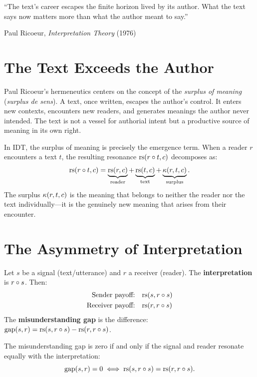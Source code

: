 \epigraph{``The text's career escapes the finite horizon lived by its author.
What the text says now matters more than what the author meant to say.''}{Paul Ricoeur, \textit{Interpretation Theory} (1976)}

\section{The Text Exceeds the Author}

Paul Ricoeur's hermeneutics centers on the concept of the \emph{surplus of
meaning} (\textit{surplus de sens}). A text, once written, escapes the author's
control. It enters new contexts, encounters new readers, and generates meanings
the author never intended. The text is not a vessel for authorial intent but a
productive source of meaning in its own right.

In IDT, the surplus of meaning is precisely the emergence term. When a reader
$r$ encounters a text $t$, the resulting resonance $\mathrm{rs}(r \circ t, c)$
decomposes as:
\[
\mathrm{rs}(r \circ t, c) = \underbrace{\mathrm{rs}(r, c)}_{\text{reader}} +
\underbrace{\mathrm{rs}(t, c)}_{\text{text}} +
\underbrace{\kappa(r, t, c)}_{\text{surplus}}.
\]
The surplus $\kappa(r, t, c)$ is the meaning that belongs to neither the reader
nor the text individually---it is the genuinely new meaning that arises from
their encounter.

\section{The Asymmetry of Interpretation}

\begin{definition}
\label{def:payoffs}
Let $s$ be a signal (text/utterance) and $r$ a receiver (reader). The
\textbf{interpretation} is $r \circ s$. Then:
\begin{align}
\text{Sender payoff:} &\quad \mathrm{rs}(s, r \circ s) \\
\text{Receiver payoff:} &\quad \mathrm{rs}(r, r \circ s)
\end{align}
The \textbf{misunderstanding gap} is the difference:
$\mathrm{gap}(s, r) = \mathrm{rs}(s, r \circ s) - \mathrm{rs}(r, r \circ s)$.
\end{definition}

\begin{theorem}
\label{thm:perfect-comm}
The misunderstanding gap is zero if and only if the signal and reader resonate
equally with the interpretation:
\[
\mathrm{gap}(s, r) = 0 \iff \mathrm{rs}(s, r \circ s) = \mathrm{rs}(r, r \circ s).
\]
\end{theorem}

